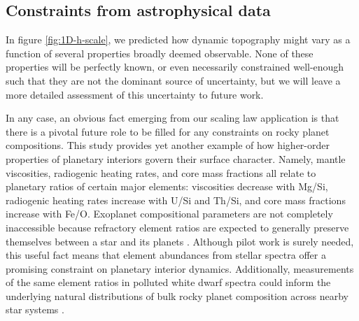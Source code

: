 \documentclass[trackchanges]{aastex63}
\newcommand{\todo}[1]{\textit{\textcolor{violet}{{#1}}}}
\begin{document}


\subsection{Constraints from astrophysical data} \label{sec:obvs}

In figure \ref{fig:1D-h-scale}, we predicted how dynamic topography might vary as a function of several properties broadly deemed observable. None of these properties will be perfectly known, or even necessarily constrained well-enough such that they are not the dominant source of uncertainty, but we will leave a more detailed assessment of this uncertainty to future work.

In any case, an obvious fact emerging from our scaling law application is that there is a pivotal future role to be filled for any constraints on rocky planet compositions. This study provides yet another example of how higher-order properties of planetary interiors govern their surface character. Namely, mantle viscosities, radiogenic heating rates, and core mass fractions all relate to planetary ratios of certain major elements: viscosities decrease with Mg/Si, radiogenic heating rates increase with U/Si and Th/Si, and core mass fractions increase with Fe/O. Exoplanet compositional parameters are not completely inaccessible because refractory element ratios are expected to generally preserve themselves between a star and its planets \citep{thiabaud_elemental_2015, hinkel_starplanet_2018, putirka_composition_2019, adibekyan_chemical_2021}. Although pilot work is surely needed, this useful fact means that element abundances from stellar spectra offer a promising constraint on planetary interior dynamics. Additionally, measurements of the same element ratios in polluted white dwarf spectra could inform the underlying natural distributions of bulk rocky planet composition across nearby star systems \citep{bonsor_host-star_2021}. 
\end{document}
